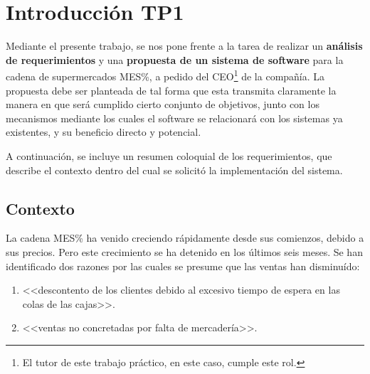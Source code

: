 
\section{Introducción TP1}

Mediante el presente trabajo, se nos pone frente a la tarea de realizar un
\textbf{análisis de requerimientos} y una \textbf{propuesta de un sistema de
software} para la cadena de supermercados MES\%, a pedido del CEO\footnote{El
tutor de este trabajo práctico, en este caso, cumple este rol.} de la compañía.
La propuesta debe ser planteada de tal forma que esta transmita claramente la
manera en que será cumplido cierto conjunto de objetivos, junto con los
mecanismos mediante los cuales el software se relacionará con los sistemas ya
existentes, y su beneficio directo y potencial.

A continuación, se incluye un resumen coloquial de los requerimientos, que
describe el contexto dentro del cual se solicitó la implementación del sistema.

\subsection{Contexto}

La cadena MES\% ha venido creciendo rápidamente desde sus comienzos, debido a
sus precios. Pero este crecimiento se ha detenido en los últimos seis meses. Se
han identificado dos razones por las cuales se presume que las ventas han
disminuído: 
\begin{enumerate}
  \item <<descontento de los clientes debido al excesivo tiempo de espera 
  en las colas de las cajas>>.
  \item <<ventas no concretadas por falta de mercadería>>.
\end{enumerate}

